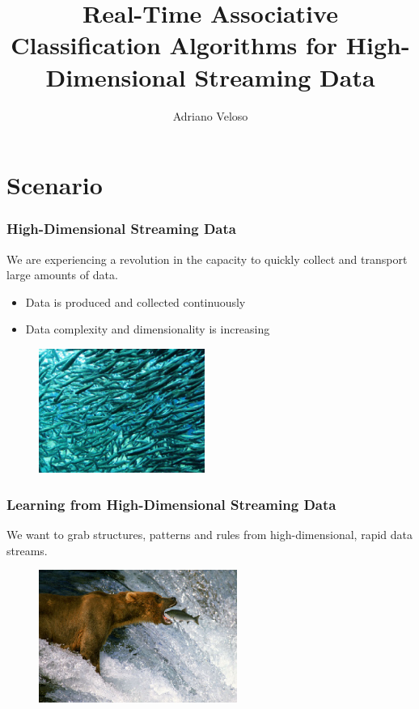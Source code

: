 \documentclass{beamer}
\title{Real-Time Associative Classification Algorithms for High-Dimensional Streaming Data}
\author{Adriano Veloso}
\institute{DCC-UFMG}
\date{}
\begin{document}
\begin{frame}
\titlepage
\end{frame}

\section{Scenario}

\begin{frame}\frametitle{High-Dimensional Streaming Data}

We are experiencing a revolution in the capacity to quickly collect and transport large amounts of data.

\begin{itemize}
\item Data is produced and collected continuously
\item Data complexity and dimensionality is increasing
\end{itemize}

\begin{figure}
\centering
\includegraphics[height=1.60in]{fishes.eps}
\end{figure}

\end{frame}

\begin{frame}\frametitle{Learning from High-Dimensional Streaming Data}

We want to grab structures, patterns and rules from high-dimensional, rapid data streams.

\begin{figure}
\centering
\includegraphics[height=1.70in]{bear.eps}
\end{figure}

\end{frame}
\end{document}
